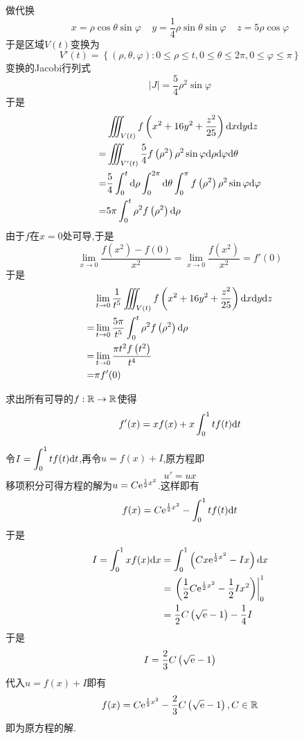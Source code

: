 \documentclass{ctexart}
\begin{document}
\begin{solution}
    做代换
    \[x=\rho\cos\theta\sin\varphi\ \ \ \ \ y=\dfrac14\rho\sin\theta\sin\varphi\ \ \ \ \ z=5\rho\cos\varphi\]
    于是区域$V(t)$变换为
    \[V'(t)=\left\{(\rho,\theta,\varphi):0\leqslant\rho\leqslant t,0\leqslant\theta\leqslant2\pi,0\leqslant\varphi\leqslant\pi\right\}\]
    变换的Jacobi行列式
    \[\left|J\right|=\dfrac{5}{4}\rho^2\sin\varphi\]
    于是
    \[\begin{aligned}
        &\iiint_{V(t)}f\left(x^2+16y^2+\dfrac{z^2}{25}\right)\mathrm{d} x\mathrm{d} y\mathrm{d} z \\
        =&\iiint_{V'(t)}\dfrac54f\left(\rho^2\right)\rho^2\sin\varphi\mathrm{d}\rho\mathrm{d}\varphi\mathrm{d}\theta \\
        =&\dfrac54\int_0^t\mathrm{d}\rho\int_0^{2\pi}\mathrm{d}\theta\int_0^\pi f\left(\rho^2\right)\rho^2\sin\varphi\mathrm{d}\varphi \\
        =&5\pi\int_0^{t}\rho^2f\left(\rho^2\right)\mathrm{d}\rho
    \end{aligned}\]
    由于$f$在$x=0$处可导,于是
    \[\lim_{x\to0}\dfrac{f\left(x^2\right)-f(0)}{x^2}=\lim_{x\to0}\dfrac{f\left(x^2\right)}{x^2}=f'(0)\]
    于是
    \[\begin{aligned}
        &\lim_{t\to0}\dfrac{1}{t^5}\iiint_{V(t)}f\left(x^2+16y^2+\dfrac{z^2}{25}\right)\mathrm{d} x\mathrm{d} y\mathrm{d} z \\
        =&\lim_{t\to0}\dfrac{5\pi}{t^5}\int_0^{t}\rho^2f\left(\rho^2\right)\mathrm{d}\rho \\
        =&\lim_{t\to0}\dfrac{\pi t^2f\left(t^2\right)}{t^4} \\
        =&\pi f'(0)
    \end{aligned}\]

\end{solution}
\begin{problem}[9.(15\songti{分})]
    求出所有可导的$f:\mathbb{R}\to\mathbb{R}$使得
    \[f'(x)=xf(x)+x\int_0^1tf(t)\mathrm{d} t\]
    
\end{problem}
\begin{solution}
    令$I=\displaystyle\int_0^1tf(t)\mathrm{d} t$,再令$u=f(x)+I$,原方程即
    \[u'=ux\]
    移项积分可得方程的解为$u=C\mathrm{e}^{\frac12x^2}$.这样即有
    \[f(x)=C\mathrm{e}^{\frac12x^2}-\int_0^{1}tf(t)\mathrm{d} t\]
    于是
    \[\begin{aligned}
        I=\int_0^1xf(x)\mathrm{d} x
        &= \int_0^1\left(Cx\mathrm{e}^{\frac12x^2}-Ix\right)\mathrm{d} x \\
        &= \left.\left(\dfrac12C\mathrm{e}^{\frac12x^2}-\dfrac{1}{2}Ix^2\right)\right|_0^1 \\
        &= \dfrac{1}{2}C\left(\sqrt{\mathrm{e}}-1\right)-\dfrac{1}{4}I
    \end{aligned}\]
    于是
    \[I=\dfrac{2}{3}C\left(\sqrt{\mathrm{e}}-1\right)\]
    代入$u=f(x)+I$即有
    \[f(x)=C\mathrm{e}^{\frac12x^2}-\dfrac{2}{3}C\left(\sqrt{\mathrm{e}}-1\right),C\in\mathbb{R}\]
    即为原方程的解.
\end{solution}
\end{document}
